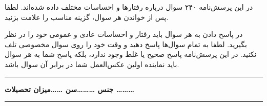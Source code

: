 \documentclass[a4paper,10pt]{article}
\begin{document}
در این پرسش‌نامه ۲۴۰ سوال درباره رفتارها و احساسات مختلف داده شده‌اند. لطفا پس از خواندن هر سوال، گزینه مناسب را علامت بزنید.

در پاسخ دادن به هر سوال باید رفتار و احساسات عادی و عمومی خود را در نظر بگیرید. لطفا به تمام سوال‌ها پاسخ دهید و وقت خود را روی سوال مخصوصی
تلف نکنید. در این پرسش‌نامه پاسخ صحیح یا غلط وجود ندارد، بلکه پاسخ شما به هر سوال باید نماینده اولین عکس‌العمل شما در برابر
آن سوال باشد.
\vspace{0.5cm}
\hrule
\vspace{0.25cm}
\begin{center}
\textbf{جنس \ldots \ldots \ldots سن \ldots \ldots میزان تحصیلات \ldots \ldots \ldots} 
\end{center}
\vspace{0.25cm}
\hrule
\vspace{0.25cm}
\end{document}
